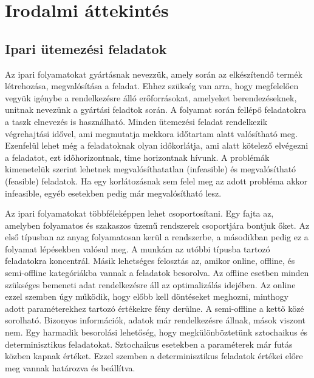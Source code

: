 \chapter{Irodalmi áttekintés}
\section{Ipari ütemezési feladatok}
Az ipari folyamatokat gyártásnak nevezzük, amely során az elkészítendő termék létrehozása, megvalósítása a feladat. Ehhez szükség van arra, hogy megfelelően vegyük igénybe a rendelkezésre álló erőforrásokat, amelyeket berendezéseknek, unitnak nevezünk a gyártási feladtok során. A folyamat során fellépő feladatokra a taszk elnevezés is használható. Minden ütemezési feladat rendelkezik végrehajtási idővel, ami megmutatja mekkora időtartam alatt valósítható meg. Ezenfelül lehet még a feladatoknak olyan időkorlátja, ami alatt kötelező elvégezni a feladatot, ezt időhorizontnak, time horizontnak hívunk. A problémák kimenetelük szerint lehetnek megvalósíthatatlan (infeasible) és megvalósítható (feasible) feladatok. Ha egy korlátozásnak sem felel meg az adott probléma akkor infeasible, egyéb esetekben pedig már megvalósítható lesz.

Az ipari folyamatokat többféleképpen lehet csoportosítani. Egy fajta az, amelyben folyamatos és szakaszos üzemű rendszerek csoportjára bontjuk őket. Az első típusban az anyag folyamatosan kerül a rendszerbe, a másodikban pedig ez a folyamat lépésekben valósul meg. A munkám az utóbbi típusba tartozó feladatokra koncentrál. Másik lehetséges felosztás az, amikor online, offline, és semi-offline kategóriákba vannak a feladatok besorolva. Az offline esetben minden szükséges bemeneti adat rendelkezésre áll az optimalizálás idejében. Az online ezzel szemben úgy működik, hogy előbb kell döntéseket meghozni, minthogy adott paraméterekhez tartozó értékekre fény derülne. A semi-offline a kettő közé sorolható. Bizonyos információk, adatok már rendelkezésre állnak, mások viszont nem. Egy harmadik besorolási lehetőség, hogy megkülönböztetünk sztochaikus és determinisztikus feladatokat. Sztochaikus esetekben a paraméterek már futás közben kapnak értéket. Ezzel szemben a determinisztikus feladatok értékei előre meg vannak határozva és beállítva.

